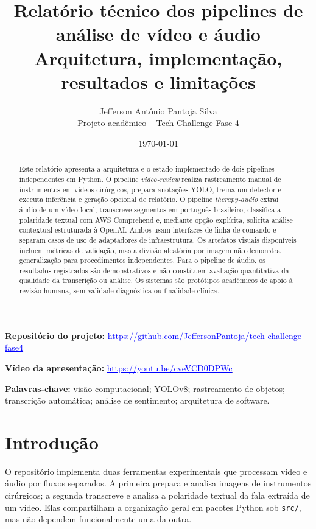 \documentclass[12pt,a4paper]{article}
\title{\textbf{Relatório técnico dos pipelines de análise de vídeo e áudio}\\
\large Arquitetura, implementação, resultados e limitações}
\author{Jefferson Antônio Pantoja Silva\\Projeto acadêmico -- Tech Challenge Fase 4}
\date{\today}
\begin{document}
\maketitle

\noindent\textbf{Repositório do projeto:} \href{https://github.com/JeffersonPantoja/tech-challenge-fase4}{\textcolor{blue}{\uline{https://github.com/JeffersonPantoja/tech-challenge-fase4}}}

\noindent\textbf{Vídeo da apresentação:} \href{https://youtu.be/cveVCD0DPWc}{\textcolor{blue}{\uline{https://youtu.be/cveVCD0DPWc}}}

\begin{abstract}
Este relatório apresenta a arquitetura e o estado implementado de dois pipelines independentes em Python. O pipeline \textit{video-review} realiza rastreamento manual de instrumentos em vídeos cirúrgicos, prepara anotações YOLO, treina um detector e executa inferência e geração opcional de relatório. O pipeline \textit{therapy-audio} extrai áudio de um vídeo local, transcreve segmentos em português brasileiro, classifica a polaridade textual com AWS Comprehend e, mediante opção explícita, solicita análise contextual estruturada à OpenAI. Ambos usam interfaces de linha de comando e separam casos de uso de adaptadores de infraestrutura. Os artefatos visuais disponíveis incluem métricas de validação, mas a divisão aleatória por imagem não demonstra generalização para procedimentos independentes. Para o pipeline de áudio, os resultados registrados são demonstrativos e não constituem avaliação quantitativa da qualidade da transcrição ou análise. Os sistemas são protótipos acadêmicos de apoio à revisão humana, sem validade diagnóstica ou finalidade clínica.
\end{abstract}

\noindent\textbf{Palavras-chave:} visão computacional; YOLOv8; rastreamento de objetos; transcrição automática; análise de sentimento; arquitetura de software.

\section{Introdução}

O repositório implementa duas ferramentas experimentais que processam vídeo e áudio por fluxos separados. A primeira prepara e analisa imagens de instrumentos cirúrgicos; a segunda transcreve e analisa a polaridade textual da fala extraída de um vídeo. Elas compartilham a organização geral em pacotes Python sob \texttt{src/}, mas não dependem funcionalmente uma da outra.
\end{document}
